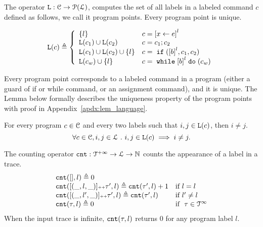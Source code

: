 The operator $\mathtt{L}: \mathcal{C} \to \mathcal{P}(\mathcal{L})$,
computes the set of all labels
in a labeled command $c$ defined as follows, we call it program points.
Every program point is unique.
\begin{defn}
\label{def:progl}
{\small
\[
 \progl(c) \triangleq
 \left\{
 \begin{array}{ll}
 \{l\} 
 & {c} = \clabel{\assign x \expr}^{l} 
 \\
 \progl({c_1}) \cup \progl({{c_2}}) 
 & {c} = {c_1};{c_2}
 \\
 \progl(c_1) \cup \progl({{c_2}}) \cup \{l\} 
 & {c} =\eif(\clabel{\bexpr}^{l}, c_1, c_2) 
 \\
 \progl(c_w) \cup \{l\} 
 & {c} = \ewhile \clabel{\bexpr}^{l} \edo (c_w)
\end{array}
\right.
\]
}
\end{defn}
%
Every program point corresponds to a labeled command in a program (either a guard of if or while command, or an assignment command), and it is unique.
The Lemma below formally describes the uniqueness property of the program points
with proof in Appendix~\ref{apdx:lem_language}.
\begin{lem}
 \label{lem:label_unique}
 For every program $c \in \mathcal{C}$ and every two labels such that
 $i, j \in \mathtt{L}(c)$, then $i \neq j$.
 \[
 \forall c \in \mathcal{C}, i, j \in \mathcal{L} ~.~ i, j \in \mathtt{L}(c)\implies i \neq j.
 \]
\end{lem}
%
%
\begin{defn}
 \label{def:counter}
The counting operator $\mathtt{cnt} : \mathcal{T}^{+\infty} \to \mathcal{L} \to \mathbb{N}$
counts the appearance of a label in a trace.
\[
\begin{array}{ll}
 \mathtt{cnt}({[]}, l) \triangleq 0 
 \\
 \mathtt{cnt}([(\_, l, \_)] {\scriptscriptstyle ++} \mathtt{\tau}', l ) \triangleq \mathtt{cnt}(\mathtt{\tau}', l) + 1 & \text{if}~ l = l
 \\
 \mathtt{cnt}([(\_, l', \_)] {\scriptscriptstyle ++} \mathtt{\tau}', l) \triangleq \mathtt{cnt}(\mathtt{\tau}', l) & \text{if}~ l' \neq l
 \\
 \mathtt{cnt}(\mathtt{\tau}, l) \triangleq 0 & \text{if }~ \mathtt{\tau} \in \mathcal{T}^{\infty}
\end{array}
\]{When the input trace is infinite, $\mathtt{cnt}(\mathtt{\tau}, l)$ returns $0$ for any program label $l$.}
\end{defn}
